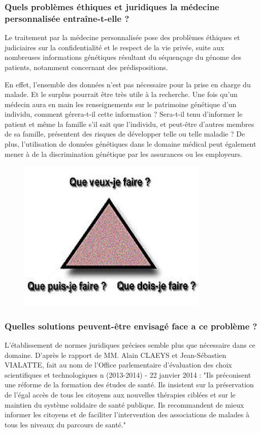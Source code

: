 \documentclass[12pt, openany]{report}
\begin{document}
\subsubsection{Quels problèmes éthiques et juridiques la médecine personnalisée entraîne-t-elle ?} 

Le traitement par la médecine personnalisée pose des problèmes éthiques et judiciaires sur la confidentialité et le respect de la vie privée, suite aux nombreuses informations génétiques résultant du séquençage du génome des patients, notamment concernant des prédispositions. 

En effet, l’ensemble des données n’est pas nécessaire pour la prise en charge du malade. Et le surplus pourrait être très utile à la recherche. Une fois qu'un médecin aura en main les renseignements sur le patrimoine génétique d'un individu, comment gérera-t-il cette information ? Sera-t-il tenu d'informer le patient et même la famille s'il sait que l'individu, et peut-être d'autres membres de sa famille, présentent des risques de développer telle ou telle maladie ? De plus, l'utilisation de données génétiques dans le domaine médical peut également mener à de la discrimination génétique par les assurances ou les employeurs.
 
 \begin{figure}[H]
\begin{center}
    \includegraphics[scale=1]{Images/im15.png}
\end{center}
\end{figure}

\subsubsection{Quelles solutions peuvent-être envisagé face a ce problème ?}

L'établissement de normes juridiques précises semble plus que nécessaire dans ce domaine. D’après le rapport de MM. Alain CLAEYS et Jean-Sébastien VIALATTE, fait au nom de l'Office parlementaire d'évaluation des choix scientifiques et technologiques 
n (2013-2014) - 22 janvier 2014 : "Ils préconisent une réforme de la formation des études de santé. Ils insistent sur la préservation de l'égal accès de tous les citoyens aux nouvelles thérapies ciblées et sur le maintien du système solidaire de santé publique. Ils recommandent de mieux informer les citoyens et de faciliter l'intervention des associations de malades à tous les niveaux du parcours de santé."
 
\end{document}
